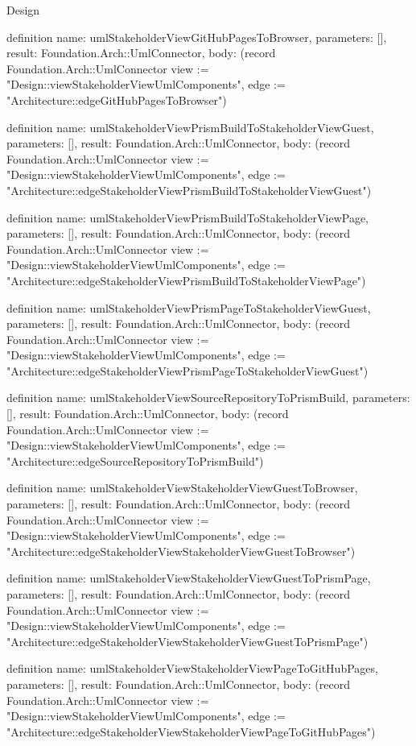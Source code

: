 \begin{lexlean}{Design}
\begin{semanticmodule}
definition{
  name: umlStakeholderViewGitHubPagesToBrowser,
  parameters: [],
  result: Foundation.Arch::UmlConnector,
  body: (record Foundation.Arch::UmlConnector {view := "Design::viewStakeholderViewUmlComponents", edge := "Architecture::edgeGitHubPagesToBrowser"})
}

definition{
  name: umlStakeholderViewPrismBuildToStakeholderViewGuest,
  parameters: [],
  result: Foundation.Arch::UmlConnector,
  body: (record Foundation.Arch::UmlConnector {view := "Design::viewStakeholderViewUmlComponents", edge := "Architecture::edgeStakeholderViewPrismBuildToStakeholderViewGuest"})
}

definition{
  name: umlStakeholderViewPrismBuildToStakeholderViewPage,
  parameters: [],
  result: Foundation.Arch::UmlConnector,
  body: (record Foundation.Arch::UmlConnector {view := "Design::viewStakeholderViewUmlComponents", edge := "Architecture::edgeStakeholderViewPrismBuildToStakeholderViewPage"})
}

definition{
  name: umlStakeholderViewPrismPageToStakeholderViewGuest,
  parameters: [],
  result: Foundation.Arch::UmlConnector,
  body: (record Foundation.Arch::UmlConnector {view := "Design::viewStakeholderViewUmlComponents", edge := "Architecture::edgeStakeholderViewPrismPageToStakeholderViewGuest"})
}

definition{
  name: umlStakeholderViewSourceRepositoryToPrismBuild,
  parameters: [],
  result: Foundation.Arch::UmlConnector,
  body: (record Foundation.Arch::UmlConnector {view := "Design::viewStakeholderViewUmlComponents", edge := "Architecture::edgeSourceRepositoryToPrismBuild"})
}

definition{
  name: umlStakeholderViewStakeholderViewGuestToBrowser,
  parameters: [],
  result: Foundation.Arch::UmlConnector,
  body: (record Foundation.Arch::UmlConnector {view := "Design::viewStakeholderViewUmlComponents", edge := "Architecture::edgeStakeholderViewStakeholderViewGuestToBrowser"})
}

definition{
  name: umlStakeholderViewStakeholderViewGuestToPrismPage,
  parameters: [],
  result: Foundation.Arch::UmlConnector,
  body: (record Foundation.Arch::UmlConnector {view := "Design::viewStakeholderViewUmlComponents", edge := "Architecture::edgeStakeholderViewStakeholderViewGuestToPrismPage"})
}

definition{
  name: umlStakeholderViewStakeholderViewPageToGitHubPages,
  parameters: [],
  result: Foundation.Arch::UmlConnector,
  body: (record Foundation.Arch::UmlConnector {view := "Design::viewStakeholderViewUmlComponents", edge := "Architecture::edgeStakeholderViewStakeholderViewPageToGitHubPages"})
}


\end{semanticmodule}
\end{lexlean}
